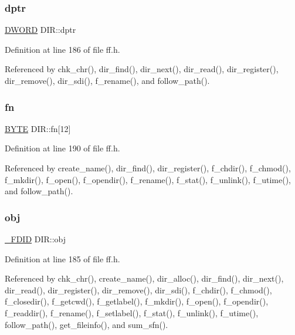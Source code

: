 \mbox{\label{structDIR_a0330e9554e1f38795debe4495156873e}} 
\subsubsection{\texorpdfstring{dptr}{dptr}}
{\footnotesize\ttfamily \hyperlink{integer_8h_ad342ac907eb044443153a22f964bf0af}{D\+W\+O\+RD} D\+I\+R\+::dptr}



Definition at line 186 of file ff.\+h.



Referenced by chk\+\_\+chr(), dir\+\_\+find(), dir\+\_\+next(), dir\+\_\+read(), dir\+\_\+register(), dir\+\_\+remove(), dir\+\_\+sdi(), f\+\_\+rename(), and follow\+\_\+path().

\mbox{\label{structDIR_ad90d974c0e7640307598c586bf141b32}} 
\subsubsection{\texorpdfstring{fn}{fn}}
{\footnotesize\ttfamily \hyperlink{integer_8h_a4ae1dab0fb4b072a66584546209e7d58}{B\+Y\+TE} D\+I\+R\+::fn\mbox{[}12\mbox{]}}



Definition at line 190 of file ff.\+h.



Referenced by create\+\_\+name(), dir\+\_\+find(), dir\+\_\+register(), f\+\_\+chdir(), f\+\_\+chmod(), f\+\_\+mkdir(), f\+\_\+open(), f\+\_\+opendir(), f\+\_\+rename(), f\+\_\+stat(), f\+\_\+unlink(), f\+\_\+utime(), and follow\+\_\+path().

\mbox{\label{structDIR_a5a4848c51616bf4ad90518c211ca3bb3}} 
\subsubsection{\texorpdfstring{obj}{obj}}
{\footnotesize\ttfamily \hyperlink{struct__FDID}{\+\_\+\+F\+D\+ID} D\+I\+R\+::obj}



Definition at line 185 of file ff.\+h.



Referenced by chk\+\_\+chr(), create\+\_\+name(), dir\+\_\+alloc(), dir\+\_\+find(), dir\+\_\+next(), dir\+\_\+read(), dir\+\_\+register(), dir\+\_\+remove(), dir\+\_\+sdi(), f\+\_\+chdir(), f\+\_\+chmod(), f\+\_\+closedir(), f\+\_\+getcwd(), f\+\_\+getlabel(), f\+\_\+mkdir(), f\+\_\+open(), f\+\_\+opendir(), f\+\_\+readdir(), f\+\_\+rename(), f\+\_\+setlabel(), f\+\_\+stat(), f\+\_\+unlink(), f\+\_\+utime(), follow\+\_\+path(), get\+\_\+fileinfo(), and sum\+\_\+sfn().

